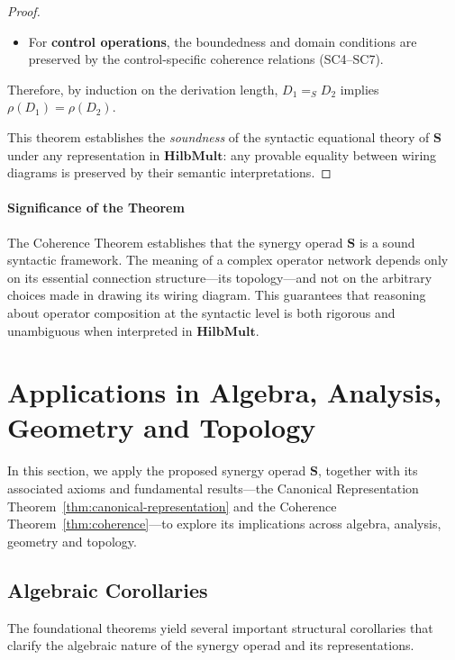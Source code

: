 \documentclass[11pt]{article}
\begin{document}
\begin{proof}
\begin{itemize}
    \item For \textbf{control operations}, the boundedness and domain conditions are preserved by the control-specific coherence relations (SC4--SC7).
\end{itemize}

Therefore, by induction on the derivation length, $D_1 =_S D_2$ implies $\rho(D_1) = \rho(D_2)$.

\medskip\noindent
This theorem establishes the \emph{soundness} of the syntactic equational theory of $\mathbf{S}$ under any representation in $\mathbf{HilbMult}$: any provable equality between wiring diagrams is preserved by their semantic interpretations.
\end{proof}




\paragraph{Significance of the Theorem}
The Coherence Theorem establishes that the synergy operad \(\mathbf{S}\) is a sound syntactic framework. The meaning of a complex operator network depends only on its essential connection structure—its topology—and not on the arbitrary choices made in drawing its wiring diagram. This guarantees that reasoning about operator composition at the syntactic level is both rigorous and unambiguous when interpreted in \(\mathbf{HilbMult}\).

\section{Applications in Algebra, Analysis, Geometry and Topology}\label{sec:Applications in Algebra, Analysis Geometry and Topology}

In this section, we apply the proposed synergy operad $\mathbf{S}$, together with its associated axioms and fundamental results—the Canonical Representation Theorem~\ref{thm:canonical-representation} and the Coherence Theorem~\ref{thm:coherence}—to explore its implications across algebra, analysis, geometry and topology. 


\subsection{Algebraic Corollaries}\label{sec:Algebraic Corollaries}

The foundational theorems yield several important structural corollaries that clarify the algebraic nature of the synergy operad and its representations.
\end{document}
